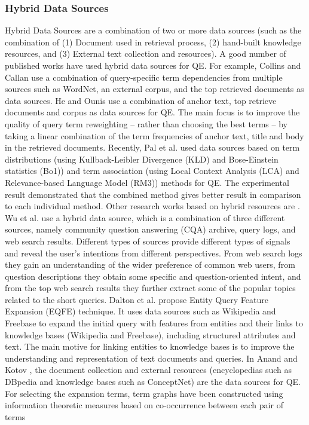 \subsubsection{Hybrid Data Sources}
Hybrid Data Sources are a combination of two or more data sources (such as the combination of (1) Document used in retrieval process, (2) hand-built knowledge resources, and (3) External text collection and resources). A good number of published works have used hybrid data sources for QE. For example, Collins and Callan \cite{collins2005query} use a combination of query-specific term dependencies from multiple sources such as WordNet,  an external corpus,  and the top retrieved documents as data sources. He and Ounis \cite{he2007combining} use a combination of anchor text, top retrieve documents and corpus as data sources for QE. The main focus is to improve the quality of query term reweighting --  rather than choosing the best terms -- by taking a linear combination of the term frequencies of anchor text, title and body in the retrieved documents. Recently, Pal et al. \cite{pal2013query} used data sources based on term distributions (using Kullback-Leibler Divergence (KLD) and Bose-Einstein statistics (Bo1)) and term association (using Local Context Analysis (LCA) and Relevance-based Language Model (RM3)) methods for QE. The experimental result demonstrated that the combined method gives better result in comparison to each individual method. Other research works based on hybrid resources are \cite{lee2008cluster,Wu:2014:ISR:2556195.2556239,dalton2014entity}. Wu et al. \cite{Wu:2014:ISR:2556195.2556239} use a hybrid data source, which is a combination of three different sources, namely community question answering (CQA) archive, query logs, and web search results. Different types of sources provide different types of signals and reveal the user's intentions from different perspectives. From web search logs they gain an understanding of the wider preference of common web users, from question descriptions they obtain some specific and question-oriented intent, and from the top web search results they further extract some of the popular topics related to the short queries. Dalton et al. \cite{dalton2014entity} propose Entity Query Feature Expansion (EQFE) technique. It uses data sources such as Wikipedia and Freebase to expand the initial query with features from entities and their links to knowledge bases (Wikipedia and Freebase), including structured attributes and text. The main motive for linking entities to knowledge bases is to improve the understanding and representation of text documents and queries. In Anand and Kotov \cite{anand2015empirical}, the document collection and external resources (encyclopedias such as DBpedia and knowledge bases such as ConceptNet) are the data sources for QE. For selecting the expansion terms, term graphs have been constructed  using information theoretic measures based on co-occurrence between each pair of terms
